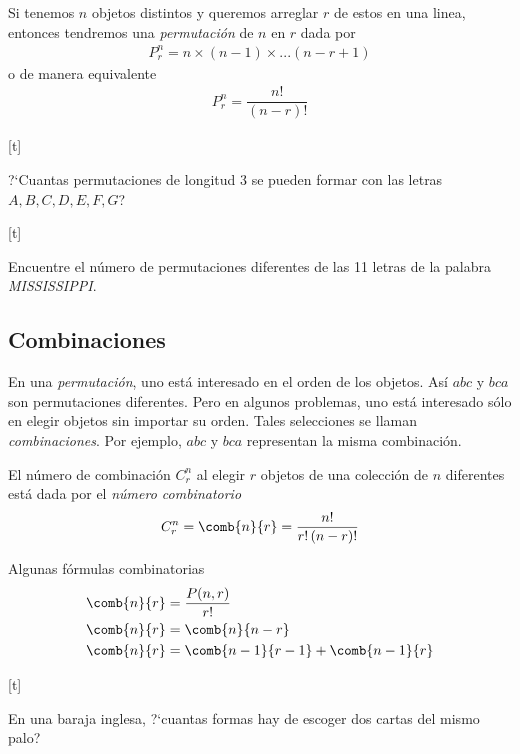 {}
 Si tenemos $n$ objetos distintos y queremos arreglar $r$ de estos en una linea, entonces tendremos una \emph{permutación} de $n$ en $r$ dada por
 \begin{align}
  \label{eq:0.1.25}
  P^{n}_{r}=n\times(n-1)\times...\left( n-r+1 \right)
 \end{align} 
o de manera equivalente
\begin{align}
 \label{eq:0.1.27}
 P^{n}_{r}=\dfrac{n!}{(n-r)!}
\end{align}


[t]{}
\begin{ejemplo}
 \label{exmp:0.1.16}
 ?`Cuantas permutaciones de longitud 3 se pueden formar con las letras $A,B,C,D,E,F,G$?
\end{ejemplo}


[t]{}
\begin{ejemplo}
 \label{exmp:0.1.17}
 Encuentre el número de permutaciones diferentes de las 11 letras de la palabra \emph{MISSISSIPPI}.
\end{ejemplo}


\subsection{Combinaciones}
{}
En una \emph{permutación}, uno está interesado en el orden de los objetos. Así $abc$ y $bca$ son permutaciones diferentes.  Pero en algunos problemas, uno está interesado sólo en elegir objetos sin importar su orden.  Tales selecciones se llaman \emph{combinaciones}.  Por ejemplo, $abc$ y $bca$ representan la misma combinación.



 El número de combinación $ C^{n}_{r} $ al elegir $r$ objetos de una colección de $n$ diferentes está dada por el \emph{número combinatorio}
  \begin{align}
   \label{eq:0.1.29}
  C^{n}_{r} = \comb{n}{r}=\dfrac{n!}{r!\left( n-r \right)!}
  \end{align}



{Algunas fórmulas combinatorias}
\begin{align}
 \label{eq:0.1.30}
 \comb{n}{r}&=\dfrac{P(n,r)}{r!} \\
 \label{eq:0.1.31}
 \comb{n}{r}&=\comb{n}{n-r}\\
 \comb{n}{r}&=\comb{n-1}{r-1}+\comb{n-1}{r}
\end{align}


[t]{}
\begin{ejemplo}
 \label{exmp:0.1.18}
 En una baraja inglesa, ?`cuantas formas hay de escoger dos cartas del mismo palo?
\end{ejemplo}


